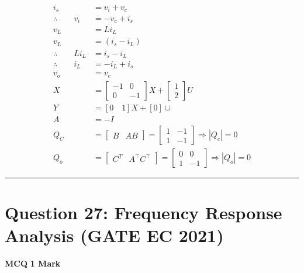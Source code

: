 \documentclass[11pt,a4paper]{article}
\begin{document}
\begin{tcolorbox}[solbox, title=Detailed Solution -- Question 26]
\[
\begin{aligned} i_{s} &=v_{i}+v_{c} \\ \therefore \qquad v_{i} &=-v_{c}+i_{s} \\ v_{L} &=L i_{L} \\ v_{L} &=\left(i_{s}-i_{L}\right) \\ \therefore \qquad L i_{L} &=i_{s}-i_{L} \\ \therefore \qquad i_{L} &=-i_{L}+i_{s} \\ v_{o} &=v_{c} \\ X &=\left[\begin{array}{cc} -1 & 0 \\ 0 & -1 \end{array}\right] X+\left[\begin{array}{ll} 1 \\ 2 \end{array}\right] U \\ Y &=[0 \quad 1] X+[0] \cup \\ A &=-I \\ Q_{C} &=\left[\begin{array}{ll} B & A B \end{array}\right]=\left[\begin{array}{ll} 1 & -1 \\ 1 & -1 \end{array}\right] \Rightarrow\left|Q_{c}\right|=0 \\ Q_{o} &=\left[\begin{array}{ll} C^{T} & A^{\top} C^{\top} \end{array}\right]=\left[\begin{array}{cc} 0 & 0 \\ 1 & -1 \end{array}\right] \Rightarrow\left|Q_{o}\right|=0 \end{aligned}
\]
\end{tcolorbox}

\vspace{1.5em}
\hrule
\vspace{1.5em}

\section*{Question 27: Frequency Response Analysis (GATE EC 2021)}
\noindent \textbf{\color{primary}MCQ} \hfill \textbf{\color{secondary}1 Mark}
\end{document}
